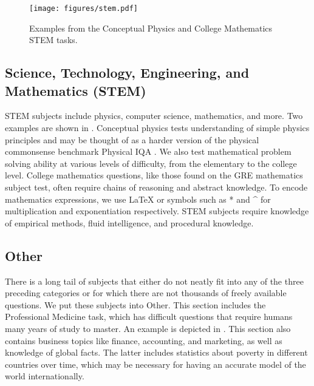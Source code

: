 \documentclass{article} \usepackage{iclr2021_conference, times}
\begin{document}
\begin{figure}[t]
    \centering
\texttt{[image: figures/stem.pdf]}
    \caption{Examples from the Conceptual Physics and College Mathematics STEM tasks.
    }
    \label{fig:stem}
    \vspace{-10pt}
\end{figure}

\subsection{Science, Technology, Engineering, and Mathematics (STEM)}
STEM subjects include physics, computer science, mathematics, and more. Two examples are shown in . Conceptual physics tests understanding of simple physics principles and may be thought of as a harder version of the physical commonsense benchmark Physical IQA \citep{bisk2019physicaliqa}. We also test mathematical problem solving ability at various levels of difficulty, from the elementary to the college level.
College mathematics questions, like those found on the GRE mathematics subject test, often require chains of reasoning and abstract knowledge. To encode mathematics expressions, we use LaTeX or symbols such as * and \^{} for multiplication and exponentiation respectively. STEM subjects require knowledge of empirical methods, fluid intelligence, and procedural knowledge.












\subsection{Other}
There is a long tail of subjects that either do not neatly fit into any of the three preceding categories or for which there are not thousands of freely available questions. We put these subjects into Other.
This section includes the Professional Medicine task, which has difficult questions that require humans many years of study to master.
An example is depicted in .
This section also contains business topics like finance, accounting, and marketing, as well as knowledge of global facts. The latter includes statistics about poverty in different countries over time, which may be necessary for having an accurate model of the world internationally.
\end{document}
